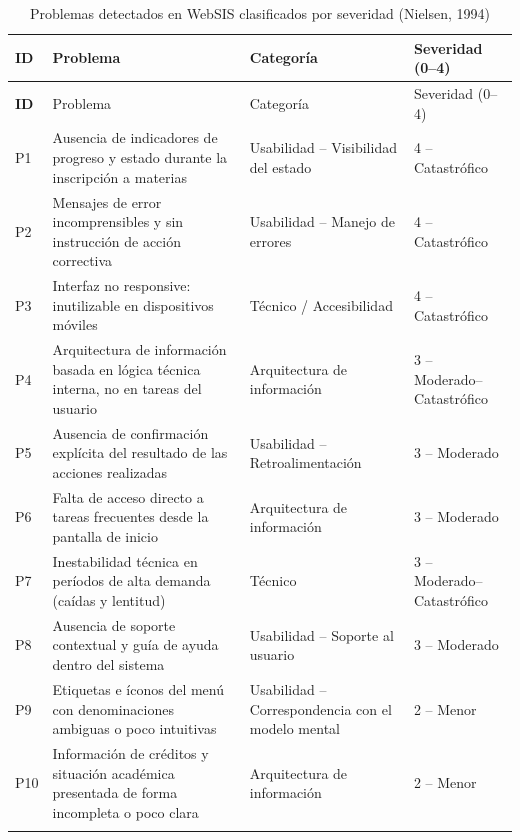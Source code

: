 {\small
\setlength{\tabcolsep}{4pt}
\renewcommand{\arraystretch}{1.2}
\begin{longtable}{|>{\bfseries}p{0.9cm}|p{6.5cm}|p{3.5cm}|p{3cm}|}
\hline
ID & Problema & Categoría & Severidad (0--4) \\
\hline
\endfirsthead

\hline
ID & Problema & Categoría & Severidad (0--4) \\
\hline
\endhead

P1 & Ausencia de indicadores de progreso y estado durante la inscripción a materias & Usabilidad -- Visibilidad del estado & 4 -- Catastrófico \\
\hline

P2 & Mensajes de error incomprensibles y sin instrucción de acción correctiva & Usabilidad -- Manejo de errores & 4 -- Catastrófico \\
\hline

P3 & Interfaz no responsive: inutilizable en dispositivos móviles & Técnico / Accesibilidad & 4 -- Catastrófico \\
\hline

P4 & Arquitectura de información basada en lógica técnica interna, no en tareas del usuario & Arquitectura de información & 3 -- Moderado--Catastrófico \\
\hline

P5 & Ausencia de confirmación explícita del resultado de las acciones realizadas & Usabilidad -- Retroalimentación & 3 -- Moderado \\
\hline

P6 & Falta de acceso directo a tareas frecuentes desde la pantalla de inicio & Arquitectura de información & 3 -- Moderado \\
\hline

P7 & Inestabilidad técnica en períodos de alta demanda (caídas y lentitud) & Técnico & 3 -- Moderado--Catastrófico \\
\hline

P8 & Ausencia de soporte contextual y guía de ayuda dentro del sistema & Usabilidad -- Soporte al usuario & 3 -- Moderado \\
\hline

P9 & Etiquetas e íconos del menú con denominaciones ambiguas o poco intuitivas & Usabilidad -- Correspondencia con el modelo mental & 2 -- Menor \\
\hline

P10 & Información de créditos y situación académica presentada de forma incompleta o poco clara & Arquitectura de información & 2 -- Menor \\
\hline

\caption{Problemas detectados en WebSIS clasificados por severidad (Nielsen, 1994)}\label{tab:problemas-severidad}
\end{longtable}
}

